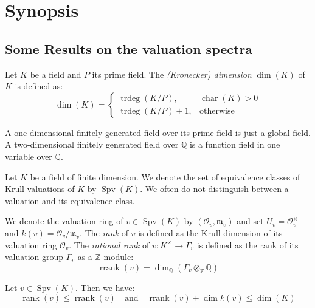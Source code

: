 \chapter{Synopsis}

\section{Some Results on the valuation spectra}

\begin{definition}
Let $K$ be a field and $P$ its prime field. The \textit{(Kronecker) dimension} $\dim(K)$ of $K$ is defined as:
\[\dim(K) = \begin{cases}
\operatorname{trdeg}(K/P), & \operatorname{char}(K)>0\\
\operatorname{trdeg}(K/P)+1, & \text{otherwise}
\end{cases} \]
\end{definition}

\begin{remark}
A one-dimensional finitely generated field over its prime field is just a global field. A two-dimensional finitely generated field over $\mathbb{Q}$ is a function field in one variable over $\mathbb{Q}$.
\end{remark}

\begin{definition}\label{2.1}
Let $K$ be a field of finite dimension. We denote the set of equivalence classes of Krull valuations of $K$ by $\operatorname{Spv}(K)$. We often do not distinguish between a valuation and its equivalence class. 

We denote the valuation ring of $v\in\operatorname{Spv}(K)$ by $(\mathcal{O}_v,\mathfrak{m}_v)$ and set $U_v=\mathcal{O}_v^\times$ and $k(v)=\mathcal{O}_v/\mathfrak{m}_v$. The \textit{rank} of $v$ is defined as the Krull dimension of its valuation ring $\mathcal{O}_v$. The \textit{rational rank} of $v:K^\times\to\Gamma_v$ is defined as the rank of its valuation group $\Gamma_v$ as a $\mathbb{Z}$-module:
\[\operatorname{rrank}(v) = \dim_\mathbb{Q}(\Gamma_v\otimes_\mathbb{Z}\mathbb{Q}) \]
\end{definition}

\begin{lemma}\label{rank-dimension-inequality}
Let $v\in\operatorname{Spv}(K)$. Then we have:
\[\operatorname{rank}(v)\leq \operatorname{rrank}(v)\quad\text{and}\quad\operatorname{rrank}(v)+\dim k(v)\leq\dim(K) \]
\end{lemma}

